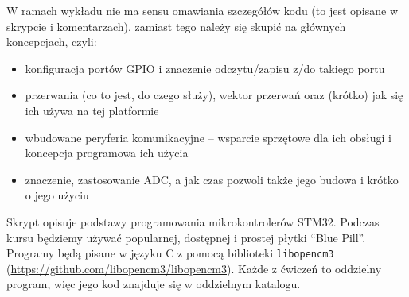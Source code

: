 % 
% 
% 
% 

\begin{teacherOnly}
	W ramach wykładu nie ma sensu omawiania szczegółów kodu (to jest opisane w skrypcie i komentarzach), zamiast tego należy się skupić na głównych koncepcjach, czyli:
	\begin{itemize}
		\item konfiguracja portów GPIO i znaczenie odczytu/zapisu z/do takiego portu
		\item przerwania (co to jest, do czego służy), wektor przerwań oraz (krótko) jak się ich używa na tej platformie
		\item wbudowane peryferia komunikacyjne – wsparcie sprzętowe dla ich obsługi i koncepcja programowa ich użycia
		\item znaczenie, zastosowanie ADC, a jak czas pozwoli także jego budowa i krótko o jego użyciu
	\end{itemize}
\end{teacherOnly}

Skrypt opisuje podstawy programowania mikrokontrolerów STM32. Podczas kursu będziemy używać
popularnej, dostępnej i prostej płytki ``Blue Pill''. Programy będą pisane w języku
C z pomocą biblioteki \Verb$libopencm3$ (\url{https://github.com/libopencm3/libopencm3}).
Każde z ćwiczeń to oddzielny program, więc jego kod znajduje się w oddzielnym katalogu.

